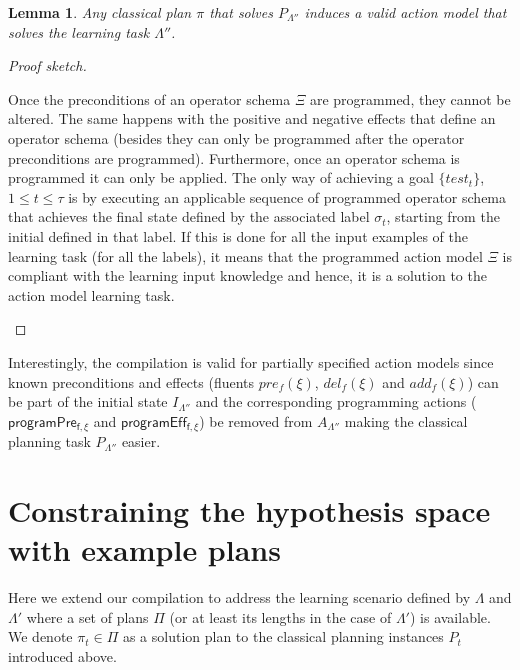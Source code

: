 \documentclass[letterpaper]{article} %
\newtheorem{lemma}[theorem]{Lemma}
\begin{document}
\begin{lemma}
Any classical plan $\pi$ that solves $P_{\Lambda''}$ induces a valid action model that solves the learning task $\Lambda''$.
\end{lemma}

\begin{proof}[Proof sketch]
\begin{small}
Once the preconditions of an operator schema $\Xi$ are programmed, they cannot be altered. The same happens with the positive and negative effects that define an operator schema (besides they can only be programmed after the operator preconditions are programmed). Furthermore, once an operator schema is programmed it can only be applied. The only way of achieving a goal $\{test_t\}$,{\small $1\leq t\leq \tau$} is by executing an applicable sequence of programmed operator schema that achieves the final state defined by the associated label $\sigma_t$, starting from the initial defined in that label. If this is done for all the input examples of the learning task (for all the labels), it means that the programmed action model $\Xi$ is compliant with the learning input knowledge and hence, it is a solution to the action model learning task.
\end{small}
\end{proof}

Interestingly, the compilation is valid for partially specified action models since known preconditions and effects (fluents $pre_f(\xi)$, $del_f(\xi)$ and $add_f(\xi)$) can be part of the initial state $I_{\Lambda''}$ and the corresponding programming actions ($\mathsf{programPre_{f,\xi}}$ and $\mathsf{programEff_{f,\xi}}$) be removed from $A_{\Lambda''}$ making the classical planning task $P_{\Lambda''}$ easier. 

\section{Constraining the hypothesis space with example plans}
Here  we extend our compilation to address the learning scenario defined by $\Lambda$ and $\Lambda'$ where a set of plans $\Pi$ (or at least its lengths in the case of $\Lambda'$) is available. We denote $\pi_t\in \Pi$ as a solution plan to the classical planning instances $P_t$ introduced above.
\end{document}
